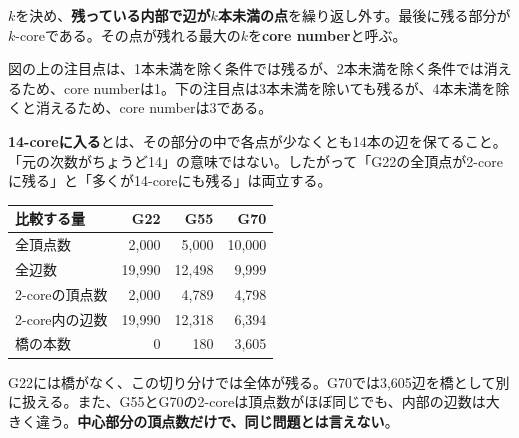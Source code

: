 $k$を決め、\textbf{残っている内部で辺が$k$本未満の点}を繰り返し外す。最後に残る部分が$k$-coreである。その点が残れる最大の$k$を\textbf{core number}と呼ぶ。

図の上の注目点は、1本未満を除く条件では残るが、2本未満を除く条件では消えるため、core numberは1。下の注目点は3本未満を除いても残るが、4本未満を除くと消えるため、core numberは3である。

\begin{center}
\end{center}
\textbf{14-coreに入る}とは、その部分の中で各点が少なくとも14本の辺を保てること。「元の次数がちょうど14」の意味ではない。したがって「G22の全頂点が2-coreに残る」と「多くが14-coreにも残る」は両立する。

\newpage
{}

\begin{center}
\begin{tabular}{lrrr}\toprule
比較する量 & G22 & G55 & G70\\\midrule
全頂点数 & 2,000 & 5,000 & 10,000\\
全辺数 & 19,990 & 12,498 & 9,999\\
2-coreの頂点数 & 2,000 & 4,789 & 4,798\\
2-core内の辺数 & 19,990 & 12,318 & 6,394\\
橋の本数 & 0 & 180 & 3,605\\\bottomrule
\end{tabular}
\end{center}
G22には橋がなく、この切り分けでは全体が残る。G70では3,605辺を橋として別に扱える。また、G55とG70の2-coreは頂点数がほぼ同じでも、内部の辺数は大きく違う。\textbf{中心部分の頂点数だけで、同じ問題とは言えない}。

